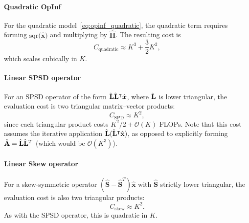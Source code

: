 \documentclass[3p,computermodern,11pt]{elsarticle}
\numberwithin{equation}{section}
\newcommand{\reducedOperatorQuadratic}{\hat{\mathbf{H}}}
\newcommand{\reducedState}{\hat{\state}}
\newcommand{\sqr}[1]{\mathrm{sqr}\big(#1 \big)}
\newcommand{\state}{\boldsymbol x}
\newcommand{\romDim}{K}
\begin{document}
\paragraph{Quadratic OpInf}
For the quadratic model~\eqref{eq:opinf_quadratic}, the quadratic term requires forming $\sqr{\reducedState}$ and multiplying by $\reducedOperatorQuadratic$. The resulting cost is
$$C_{\mathrm{quadratic}} \approx  \romDim^3 + \frac{3}{2} \romDim^2 ,$$
which scales cubically in $\romDim$.

\paragraph{Linear SPSD operator}
For an SPSD operator of the form $\skew{-4}\hat{\mathbf{L}}\skew{-4} \hat{\mathbf{L}}^\intercal \reducedState$, where $\skew{-4}\hat{\mathbf{L}}$ is lower triangular, the evaluation cost is two triangular matrix--vector products:
$$C_{\mathrm{SPD}} \approx \romDim^2,$$
since each triangular product costs $\romDim^2/2 + \mathcal{O}(\romDim)$ FLOPs. 
Note that this cost assumes the iterative application $\skew{-4} \hat{\mathbf{L}}(\skew{-4} \hat{\mathbf{L}}^\intercal \hat{\mathbf{x}})$, as opposed to explicitly forming 
$\hat{\mathbf{A}}=\skew{-4}\hat{\mathbf{L}}\skew{-4}\hat{\mathbf{L}}^T$ (which would be $\mathcal{O}(K^3)$).

\paragraph{Linear Skew operator}
For a skew-symmetric operator $\left(\hat{\mathbf{S}}-\hat{\mathbf{S}}^T\right)\reducedState$ with $\hat{\mathbf{S}}$ strictly lower triangular, the evaluation cost is also two triangular products:
$$C_{\mathrm{skew}} \approx \romDim^2.$$
As with the SPSD operator, this is quadratic in $\romDim$.
\end{document}
